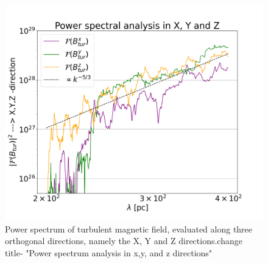 \documentclass[usenatbib]{mnras}
\newcommand{\Andrew}[1]{\textcolor{dg}{#1}}
\begin{document}
\begin{figure}
    \includegraphics[width = 0.49\linewidth]{Images/Jan27_Test_PowerSpectrum_vs_lambda_seed_10_lmin_200.0lmax_400.0.png}
    \caption{Power spectrum of turbulent magnetic field, evaluated along three orthogonal directions, namely the X, Y and Z directions.\Andrew{change title- "Power spectrum analysis in x,y, and z directions"}}
    \label{fig:PowerSpectrum}
\end{figure}

\end{document}
